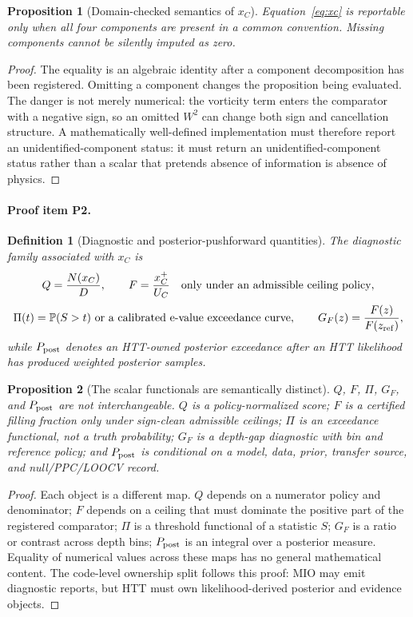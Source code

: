 \documentclass[11pt]{article}
\newcommand{\Prob}{\mathbb{P}}
\newcommand{\GF}{G_F}
\newcommand{\Ppost}{P_{\rm post}}
\newtheorem{definition}{Definition}
\newtheorem{proposition}{Proposition}
\begin{document}
\begin{proposition}[Domain-checked semantics of \(x_C\)]
Equation~\eqref{eq:xc} is reportable only when all four components are present in a common convention.  Missing components cannot be silently imputed as zero.
\end{proposition}
\begin{proof}
The equality is an algebraic identity after a component decomposition has been registered.  Omitting a component changes the proposition being evaluated.  The danger is not merely numerical: the vorticity term enters the comparator with a negative sign, so an omitted \(W^2\) can change both sign and cancellation structure.  A mathematically well-defined implementation must therefore report an unidentified-component status: it must return an unidentified-component status rather than a scalar that pretends absence of information is absence of physics.
\end{proof}

\paragraph{Proof item P2.}
\begin{definition}[Diagnostic and posterior-pushforward quantities]
The diagnostic family associated with \(x_C\) is
\[
  Q=\frac{N(x_C)}{D},\qquad
  F=\frac{x_C^+}{U_C}\quad\hbox{only under an admissible ceiling policy},
\]
\[
  \Pi(t)=\Prob(S>t)\hbox{ or a calibrated e-value exceedance curve},\qquad
  \GF(z)=\frac{F(z)}{F(z_{\rm ref})},
\]
while \(\Ppost\) denotes an HTT-owned posterior exceedance after an HTT likelihood has produced weighted posterior samples.
\end{definition}

\begin{proposition}[The scalar functionals are semantically distinct]
\(Q\), \(F\), \(\Pi\), \(\GF\), and \(\Ppost\) are not interchangeable.  \(Q\) is a policy-normalized score; \(F\) is a certified filling fraction only under sign-clean admissible ceilings; \(\Pi\) is an exceedance functional, not a truth probability; \(\GF\) is a depth-gap diagnostic with bin and reference policy; and \(\Ppost\) is conditional on a model, data, prior, transfer source, and null/PPC/LOOCV record.
\end{proposition}
\begin{proof}
Each object is a different map.  \(Q\) depends on a numerator policy and denominator; \(F\) depends on a ceiling that must dominate the positive part of the registered comparator; \(\Pi\) is a threshold functional of a statistic \(S\); \(\GF\) is a ratio or contrast across depth bins; \(\Ppost\) is an integral over a posterior measure.  Equality of numerical values across these maps has no general mathematical content.  The code-level ownership split follows this proof: MIO may emit diagnostic reports, but HTT must own likelihood-derived posterior and evidence objects.
\end{proof}
\end{document}
